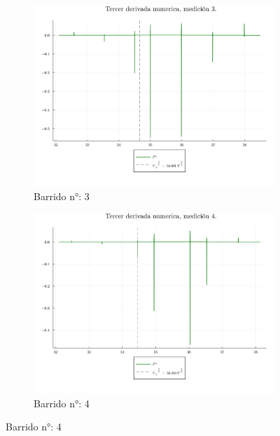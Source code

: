 \begin{figure}[H]
	\ContinuedFloat
	\centering
	\begin{subfigure}[b]{0.49\textwidth}
		\centering
		\includegraphics[width=\linewidth]{img/potderst3.png}
		\caption{Barrido n°: 3}
		\label{fig:potderst3}
	\end{subfigure}
	\hfill
	\begin{subfigure}[b]{0.49\textwidth}
		\centering
		\includegraphics[width=\linewidth]{img/potderst4.png}
		\caption{Barrido n°: 4}
		\label{fig:potderst4}
	\end{subfigure}
	
\end{figure}

